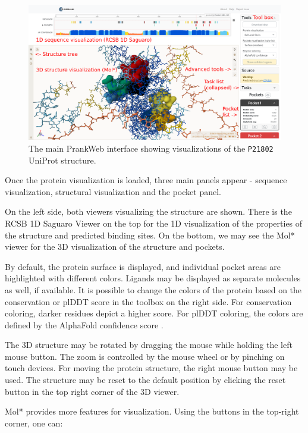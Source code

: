\begin{figure}[ht]
    \centering
    \includegraphics[width=\textwidth]{img/pw_predict.png}
    \caption{The main PrankWeb interface showing visualizations of the \texttt{P21802} UniProt structure.}
    \label{fig:prankweb_viewers}
\end{figure}

Once the protein visualization is loaded, three main panels appear - sequence visualization, structural visualization and the pocket panel.

On the left side, both viewers visualizing the structure are shown. There is the RCSB 1D Saguaro Viewer on the top for the 1D visualization of the properties of the structure and predicted binding sites. On the bottom, we may see the Mol* viewer for the 3D visualization of the structure and pockets. 

By default, the protein surface is displayed, and individual pocket areas are highlighted with different colors. Ligands may be displayed as separate molecules as well, if available. It is possible to change the colors of the protein based on the conservation or plDDT score in the toolbox on the right side. For conservation coloring, darker residues depict a higher score. For plDDT coloring, the colors are defined by the AlphaFold confidence score \cite{david2022alphafold}.

The 3D structure may be rotated by dragging the mouse while holding the left mouse button. The zoom is controlled by the mouse wheel or by pinching on touch devices. For moving the protein structure, the right mouse button may be used. The structure may be reset to the default position by clicking the reset button in the top right corner of the 3D viewer.

Mol* provides more features for visualization. Using the buttons in the top-right corner, one can:


